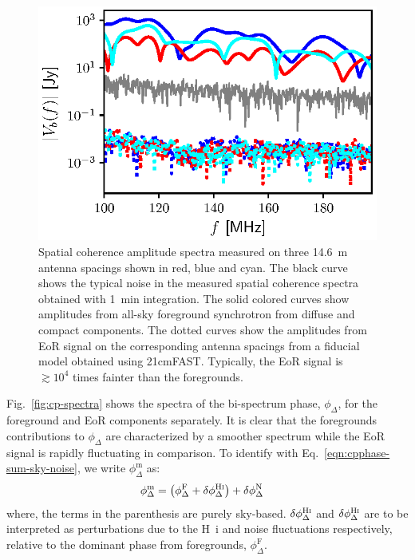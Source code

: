 \documentclass[
reprint,
superscriptaddress,
amsmath,
amssymb,
aps,
prd
]{revtex4-1}
\begin{document}
\begin{figure}[htb]
\includegraphics[width=\linewidth]{visamp_spectra_asm_eor_noise}
\caption{Spatial coherence amplitude spectra measured on three 14.6~m antenna spacings shown in red, blue and cyan. The black curve shows the typical noise in the measured spatial coherence spectra obtained with 1~min integration. The solid colored curves show amplitudes from all-sky foreground synchrotron from diffuse and compact components. The dotted curves show the amplitudes from EoR signal on the corresponding antenna spacings from a fiducial model obtained using 21cmFAST. Typically, the EoR signal is $\gtrsim 10^4$ times fainter than the foregrounds. \label{fig:vis-spectra}}
\end{figure}

Fig.~\ref{fig:cp-spectra} shows the spectra of the bi-spectrum phase, $\phi_\Delta$, for the foreground and EoR components separately. It is clear that the foregrounds contributions to $\phi_\Delta$ are characterized by a smoother spectrum while the EoR signal is rapidly fluctuating in comparison. To identify with Eq.~\ref{eqn:cpphase-sum-sky-noise}, we write $\phi_\Delta^\textrm{m}$ as:
\begin{align}\label{eqn:cp-components}
  \phi_\Delta^\textrm{m} &= \left(\phi_\Delta^\textrm{F} + \delta\phi_\Delta^\textrm{H{\sc i}}\right) + \delta\phi_\Delta^\textrm{N}
\end{align}
where, the terms in the parenthesis are purely sky-based. $\delta\phi_\Delta^\textrm{H{\sc i}}$ and $\delta\phi_\Delta^\textrm{H{\sc i}}$ are to be interpreted as perturbations due to the H~{\sc i} and noise fluctuations respectively, relative to the dominant phase from foregrounds, $\phi_\Delta^\textrm{F}$.
\end{document}
